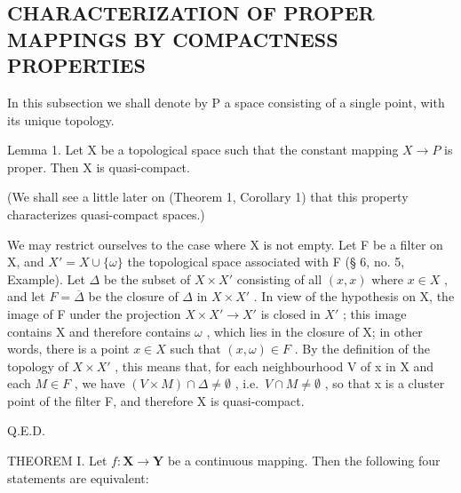 \subsection{CHARACTERIZATION OF PROPER MAPPINGS BY COMPACTNESS PROPERTIES}

In this subsection we shall denote by P a space consisting of a single point, with its unique topology.

Lemma 1. Let X be a topological space such that the constant mapping \(X \rightarrow P\) is proper. Then X is quasi-compact.

(We shall see a little later on (Theorem 1, Corollary 1) that this property characterizes quasi-compact spaces.)

We may restrict ourselves to the case where X is not empty. Let F be a filter on X, and \(X' = X \cup \{\omega\}\) the topological space associated with F (§ 6, no. 5, Example). Let \(\Delta\) be the subset of \(X \times X'\) consisting of all \((x, x)\) where \(x \in X\) , and let \(F = \overline{\Delta}\) be the closure of \(\Delta\) in \(X \times X'\) . In view of the hypothesis on X, the image of F under the projection \(X \times X' \to X'\) is closed in \(X'\) ; this image contains X and therefore contains \(\omega\) , which lies in the closure of X; in other words, there is a point \(x \in X\) such that \((x, \omega) \in F\) . By the definition of the topology of \(X \times X'\) , this means that, for each neighbourhood V of x in X and each \(M \in F\) , we have \((V \times M) \cap \Delta \neq \emptyset\) , i.e.~\(V \cap M \neq \emptyset\) , so that x is a cluster point of the filter F, and therefore X is quasi-compact.

Q.E.D.

THEOREM I. Let \(f: \mathbf{X} \to \mathbf{Y}\) be a continuous mapping. Then the following four statements are equivalent:

